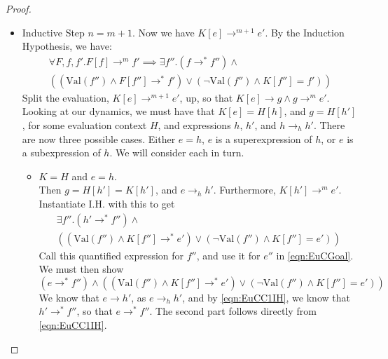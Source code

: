 \documentclass[twoside,11pt,openright]{report}
\newcommand{\expr}{e}
\newcommand{\elctx}{K}
\newcommand{\step}{\rightarrow}
\newcommand{\stepS}{\rightarrow^*}
\newcommand{\hstep}{\rightarrow_h}
\newcommand{\Val}[1]{\mathrm{Val}(#1)}
\begin{document}
\begin{proof}
\begin{itemize}
    \item Inductive Step $n = m + 1$. Now we have $\elctx[\expr] \step^{m + 1} \expr'$. By the Induction Hypothesis, we have:
    \begin{multline}\label{eqn:EuCIH}
      \forall F, f, f'. F[f] \step^m f' \implies \exists f'' . (f \stepS f'') \land \\
      \left( (\Val{f''} \land F[f''] \stepS f') \lor
      (\neg \Val{f''} \land \elctx[f''] = f') \right)
    \end{multline}
    Split the evaluation, $\elctx[\expr] \step^{m + 1} \expr'$, up, so that 
    $\elctx[\expr] \step g \land g \step^{m} \expr'$. Looking at our dynamics, we must have that $\elctx[\expr] = H[h]$, and $g = H[h']$, for some evaluation context $H$, and expressions $h$, $h'$, and $h \hstep h'$.
    There are now three possible cases. Either $\expr = h$, $\expr$ is a superexpression of $h$, or $\expr$ is a subexpression of $h$. We will consider each in turn.
    \begin{itemize}
      \item $\elctx = H$ and $\expr = h$.\\
        Then $g = H[h'] = \elctx[h']$, and $\expr \hstep h'$. 
        Furthermore, $\elctx[h'] \step^m \expr'$. Instantiate I.H. with this to get
        \begin{multline}\label{eqn:EuCC1IH}
          \exists f'' . (h' \stepS f'') \land\\
          \left((\Val{f''} \land \elctx[f''] \stepS \expr') \lor
          (\neg \Val{f''} \land \elctx[f''] = \expr') \right)
        \end{multline}
        Call this quantified expression for $f''$, and use it for $\expr''$ in \ref{eqn:EuCGoal}. We must then show
        \begin{equation*}
          (\expr \stepS f'') \land 
          \left( (\Val{f''} \land \elctx[f''] \stepS \expr') \lor
          (\neg \Val{f''} \land \elctx[f''] = \expr') \right)
        \end{equation*}
        We know that $\expr \step h'$, as $\expr \hstep h'$, and by 
        \ref{eqn:EuCC1IH}, we know that $h' \stepS f''$, so that $\expr \stepS f''$. The second part follows directly from \ref{eqn:EuCC1IH}.
      

\end{itemize}
\end{itemize}
\end{proof}
\end{document}

